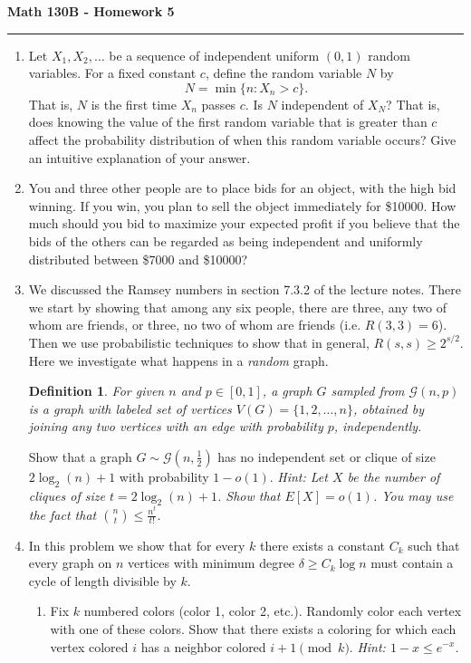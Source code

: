 \documentclass[11pt,letterpaper]{article}
\newcommand{\mcal}[1]{\mathcal{#1}}
\theoremstyle{plain}
\newtheorem{definition}[theorem]{Definition}
\begin{document}
\begin{center}
{\bf \Large Math 130B - Homework 5}
\vspace{0.2cm}
\hrule
\end{center}

\begin{enumerate}
	\item Let $X_1, X_2, \ldots$ be a sequence of independent uniform $(0,1)$ random variables. For a fixed constant $c$, define the random variable $N$ by
	\[
	N = \min\{n: X_n>c\}.
	\]
	That is, $N$ is the first time $X_n$ passes $c$. Is $N$ independent of $X_N$? That is, does knowing the value of the first random variable that is greater than $c$ affect the probability distribution of when this random variable occurs? Give an intuitive explanation of your answer.


	\item You and three other people are to place bids for an object, with the high bid winning. If you win, you plan to sell the object immediately for \$10000. How much should you bid to maximize your expected profit if you believe that the bids of the others can be regarded as being independent and uniformly distributed between \$7000 and \$10000?

	\item We discussed the Ramsey numbers in  section 7.3.2 of the lecture notes. There we start by showing that among any six people, there are three, any two of whom are friends, or three, no two of whom are friends (i.e. $R(3,3) = 6$). Then we use probabilistic techniques to show that in general, $R(s, s) \geq 2^{s/2}$. Here we investigate what happens in a \textit{random} graph.

	\begin{definition}
		For given $n$ and $p\in [0,1]$, a graph $G$ sampled from $\mcal{G}(n, p)$ is a graph with labeled set of vertices $V(G) = \{1, 2, \ldots, n\}$, obtained by joining any two vertices with an edge with probability $p$, independently.
	\end{definition}

	Show that a graph $G\sim \mcal{G}(n, \frac{1}{2})$ has no independent set or clique of size $2\log_2(n) + 1$ with probability $1-o(1)$. \textit{Hint: Let $X$ be the number of cliques of size $t = 2\log_2(n)+1$. Show that $E[X] = o(1)$. You may use the fact that $\binom{n}{t}\leq \frac{n^t}{t!}$.}


	\item In this problem we show that for every $k$ there exists a constant $C_k$ such that every graph on $n$ vertices with minimum degree $\delta \geq C_k\log n$ must contain a cycle of length divisible by $k$.
	\begin{enumerate}
		\item Fix $k$ numbered colors (color 1, color 2, etc.). Randomly color each vertex with one of these colors. Show that there exists a coloring for which each vertex colored $i$ has a neighbor colored $i+1 \pmod{k}$. \textit{Hint: $1-x\leq e^{-x}$.}


\end{enumerate}
\end{enumerate}
\end{document}
